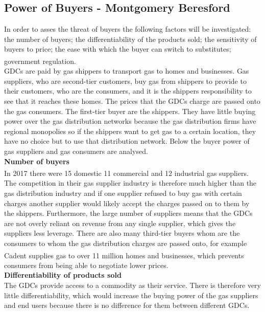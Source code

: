 \documentclass[11pt]{article}		%
\newcommand{\supercite}[1]{\textsuperscript{\cite{#1}}}		%
\begin{document}
		
		\subsection[Power of Buyers]{Power of Buyers - Montgomery Beresford}
		        In order to asses the threat of buyers the following factors will be investigated: the number of buyers; the differentiability of the products sold; the sensitivity of buyers to price; the ease with which the buyer can switch to substitutes; government regulation.\supercite{Barney}
		        \\
                GDCs are paid by gas shippers to transport gas to homes and businesses. Gas suppliers, who are second-tier customers, buy gas from shippers to provide to their customers, who are the consumers, and it is the shippers responsibility to see that it reaches these homes. The prices that the GDCs charge are passed onto the gas consumers. The first-tier buyer are the shippers. They have little buying power over the gas distribution networks because the gas distribution firms have regional monopolies so if the shippers want to get gas to a certain location, they have no choice but to use that distribution network. Below the buyer power of gas suppliers and gas consumers are analysed.
                \\
                \textbf{Number of buyers}
                \\
                In 2017 there were 15 domestic  11 commercial and 12 industrial  gas suppliers.\supercite{competition_in_gas_supply} The competition in their gas supplier industry is therefore much higher than the gas distribution industry and if one supplier refused to buy gas with certain charges another supplier would likely accept the charges passed on to them by the shippers. Furthermore, the large number of suppliers means that the GDCs are not overly reliant on revenue from any single supplier, which gives the suppliers less leverage. There are also many third-tier buyers whom are the consumers to whom the gas distribution charges are passed onto, for example Cadent supplies gas to over 11 million homes and businesses\supercite{Cadent_Plan}, which prevents consumers from being able to negotiate lower prices.
                \\
                \textbf{Differentiability of products sold}
                \\
                The GDCs provide access to a commodity as their service. There is therefore very little differentiability, which would increase the buying power of the gas suppliers and end users because there is no difference for them between different GDCs.
\end{document}
